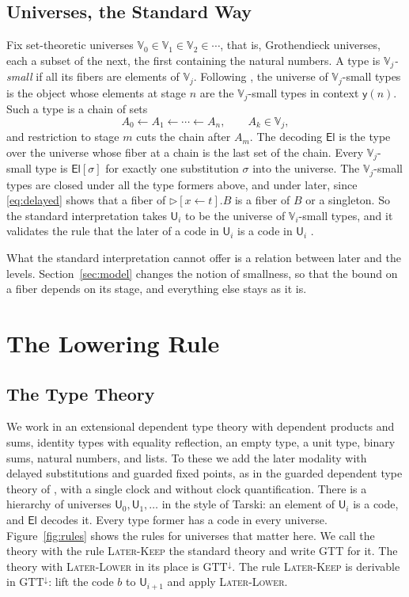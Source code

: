 \documentclass[acmsmall,nonacm,screen]{acmart}
\newcommand{\later}{{\triangleright}}
\newcommand{\Uv}{\mathsf{U}}
\newcommand{\El}{\mathsf{El}}
\newcommand{\Vg}{\mathbb{V}}
\newcommand{\yo}{\mathsf{y}}
\newcommand{\dsub}[2]{[#1 \leftarrow #2]}
\begin{document}
\subsection{Universes, the Standard Way}\label{sec:standard}

Fix set-theoretic universes $\Vg_0 \in \Vg_1 \in \Vg_2 \in \cdots$, that is, Grothendieck
universes, each a subset of the next, the first containing the natural numbers. A type is
\emph{$\Vg_j$-small} if all its fibers are elements of $\Vg_j$. Following
\citet{HofmannStreicher1997}, the universe of $\Vg_j$-small types is the object whose
elements at stage $n$ are the $\Vg_j$-small types in context $\yo(n)$. Such a type is a
chain of sets
\[
  A_0 \longleftarrow A_1 \longleftarrow \cdots \longleftarrow A_n, \qquad A_k \in \Vg_j ,
\]
and restriction to stage $m$ cuts the chain after $A_m$. The decoding $\El$ is the type over
the universe whose fiber at a chain is the last set of the chain. Every $\Vg_j$-small type
is $\El[\sigma]$ for exactly one substitution $\sigma$ into the universe. The $\Vg_j$-small
types are closed under all the type formers above, and under later, since
\eqref{eq:delayed} shows that a fiber of $\later\dsub{x}{t}.B$ is a fiber of $B$ or a
singleton. So the standard interpretation takes $\Uv_i$ to be the universe of
$\Vg_i$-small types, and it validates the rule that the later of a code in $\Uv_i$ is a
code in $\Uv_i$ \citep{BM2013}.

What the standard interpretation cannot offer is a relation between later and the levels.
Section~\ref{sec:model} changes the notion of smallness, so that the bound on a fiber
depends on its stage, and everything else stays as it is.

\section{The Lowering Rule}\label{sec:rule}

\subsection{The Type Theory}

We work in an extensional dependent type theory with dependent products and sums, identity
types with equality reflection, an empty type, a unit type, binary sums, natural numbers,
and lists. To these we add the later modality with delayed substitutions and guarded fixed
points, as in the guarded dependent type theory of \citet{gDTT2016}, with a single clock and
without clock quantification. There is a hierarchy of universes $\Uv_0, \Uv_1, \ldots$ in
the style of Tarski: an element of $\Uv_i$ is a code, and $\El$ decodes it. Every type
former has a code in every universe. Figure~\ref{fig:rules} shows the rules for universes
that matter here. We call the theory with the rule \textsc{Later-Keep} the standard theory
and write GTT for it. The theory with \textsc{Later-Lower} in its place is $\mathrm{GTT}^{\downarrow}$.
The rule \textsc{Later-Keep} is derivable in $\mathrm{GTT}^{\downarrow}$: lift the code $b$
to $\Uv_{i+1}$ and apply \textsc{Later-Lower}.
\end{document}
